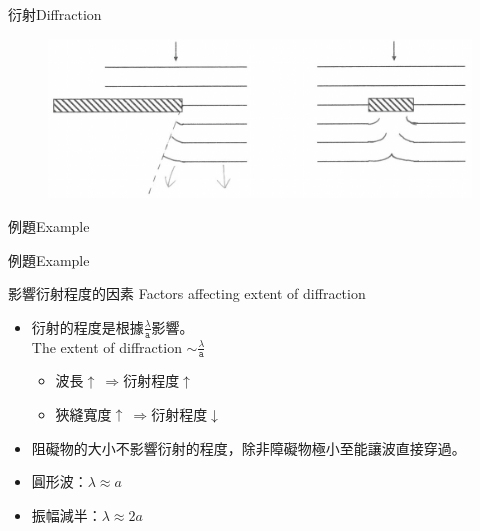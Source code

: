 \documentclass[beamer=true]{standalone}
\begin{document}
\begin{frame}{衍射Diffraction}
    \begin{figure}
        \centering
        \includegraphics[width=1\linewidth]{images/Screenshot 2023-09-27 at 9.09.03 PM.png}


    \end{figure}
\end{frame}

\begin{frame}[t]{例題Example}

\end{frame}

\begin{frame}[t]{例題Example}

\end{frame}


\begin{frame}{影響衍射程度的因素 Factors affecting extent of diffraction}
    \begin{itemize}
        \item 衍射的程度是根據$\displaystyle \frac{\lambda}{\texttt{a}}$影響。\\The extent of diffraction $\sim\displaystyle \frac{\lambda}{\texttt{a}}$
              \begin{itemize}
                  \item 波長$\uparrow\ \Rightarrow$衍射程度$\uparrow$
                  \item 狹縫寬度$\uparrow\ \Rightarrow$衍射程度$\downarrow$
              \end{itemize}
        \item 阻礙物的大小不影響衍射的程度，除非障礙物極小至能讓波直接穿過。
        \item 圓形波：\(\lambda \approx a\)
        \item 振幅減半：$\lambda \approx 2a$
    \end{itemize}
\end{frame}
\end{document}
